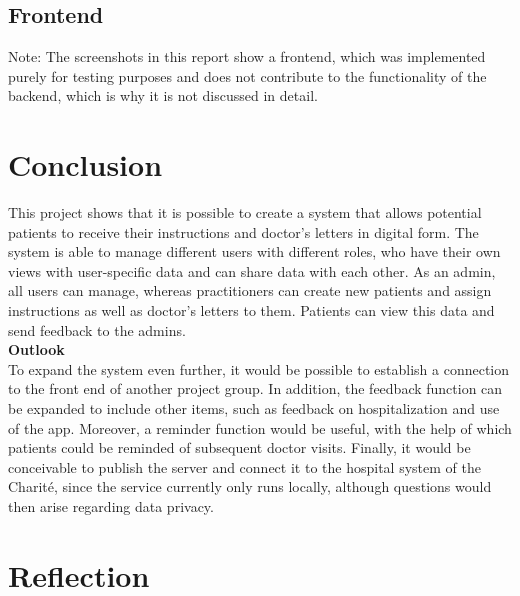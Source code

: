 \documentclass[]{report}
\begin{document}
\subsection{Frontend}
Note: The screenshots in this report show a frontend, which was implemented purely for testing purposes and does not contribute to the functionality of the backend, which is why it is not discussed in detail.

\section{Conclusion}
This project shows that it is possible to create a system that allows potential patients to receive their instructions and doctor's letters in digital form. The system is able to manage different users with different roles, who have their own views with user-specific data and can share data with each other. As an admin, all users can manage, whereas practitioners can create new patients and assign instructions as well as doctor's letters to them. Patients can view this data and send feedback to the admins.\\
\textbf{Outlook}\\
To expand the system even further, it would be possible to establish a connection to the front end of another project group. In addition, the feedback function can be expanded to include other items, such as feedback on hospitalization and use of the app. Moreover, a reminder function would be useful, with the help of which patients could be reminded of subsequent doctor visits. Finally, it would be conceivable to publish the server and connect it to the hospital system of the Charité, since the service currently only runs locally, although questions would then arise regarding data privacy.

\section{Reflection}

{}

\end{document}
